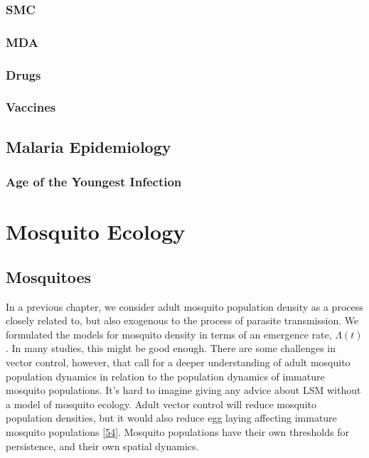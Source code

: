 \documentclass[
]{book}
\begin{document}
\hypertarget{smc}{%
\section{SMC}\label{smc}}

\hypertarget{mda}{%
\section{MDA}\label{mda}}

\hypertarget{drugs}{%
\section{Drugs}\label{drugs}}

\hypertarget{vaccines}{%
\section{Vaccines}\label{vaccines}}

\hypertarget{malaria-epidemiology}{%
\chapter{Malaria Epidemiology}\label{malaria-epidemiology}}

\hypertarget{age-of-the-youngest-infection}{%
\section{Age of the Youngest Infection}\label{age-of-the-youngest-infection}}

\hypertarget{part-mosquito-ecology}{%
\part{Mosquito Ecology}\label{part-mosquito-ecology}}

\hypertarget{mosquitoes}{%
\chapter{Mosquitoes}\label{mosquitoes}}

In a previous chapter, we consider adult mosquito population density as a process closely related to, but also exogenous to the process of parasite transmission. We formulated the models for mosquito density in terms of an emergence rate, \(\Lambda(t)\). In many studies, this might be good enough. There are some challenges in vector control, however, that call for a deeper understanding of adult mosquito population dynamics in relation to the population dynamics of immature mosquito populations. It's hard to imagine giving any advice about LSM without a model of mosquito ecology. Adult vector control will reduce mosquito population densities, but it would also reduce egg laying affecting immature mosquito populations {[}\protect\hyperlink{ref-BradyOJ2015AdultVector}{54}{]}. Mosquito populations have their own thresholds for persistence, and their own spatial dynamics.
\end{document}
